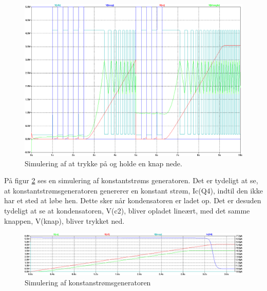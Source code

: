 \begin{figure}[h]
\centering
\includegraphics[width=\textwidth]{teknisk/volumenkontrol/stress-test.png}
\caption{Simulering af at trykke på og holde en knap nede.}
\label{fig:stresstest}
\end{figure}

På figur \ref{fig:konstantstroem} ses en simulering af konstantstrøms generatoren. Det er tydeligt at se, at konstantstrømsgeneratoren genererer en konstant strøm, Ic(Q4), indtil den ikke har et sted at løbe hen. Dette sker når kondensatoren er ladet op. Det er desuden tydeligt at se at kondensatoren, V(c2), bliver opladet lineært, med det samme knappen, V(knap), bliver trykket ned. 

\begin{figure}[h]
\centering
\includegraphics[width=\textwidth]{teknisk/volumenkontrol/konstantstroem.png}
\caption{Simulering af konstanstrømsgeneratoren}
\label{fig:konstantstroem}
\end{figure}